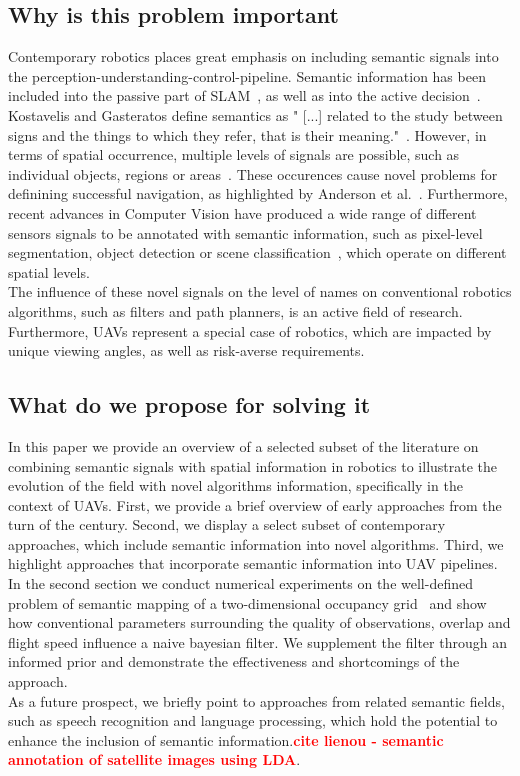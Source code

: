 \documentclass[twocolumn,letterpaper]{IEEEAerospaceCLS}  %
\newcommand\todo[1]{\textbf{\textcolor{red}{#1}}}
\begin{document}
\subsection{Why is this problem important}
Contemporary robotics places great emphasis on including semantic signals into the perception-understanding-control-pipeline. Semantic information has been included into the passive part of SLAM~\cite{cadena_past_2016,zhang_hierarchical_2019}, as well as into the active decision~\cite{koch_automatic_2019,alirezaie_exploiting_2017}. Kostavelis and Gasteratos define semantics as " [...] related to the study between signs and the things to which they refer, that is their meaning."~\cite{kostavelis_semantic_2015}. However, in terms of spatial occurrence, multiple levels of signals are possible, such as individual objects, regions or areas~\cite{kostavelis_semantic_2015}. These occurences cause novel problems for definining successful navigation, as highlighted by Anderson et al.~\cite{anderson_evaluation_2018}. Furthermore, recent advances in Computer Vision have produced a wide range of different sensors signals to be annotated with semantic information, such as pixel-level segmentation, object detection or scene classification~\cite{alom_history_2018}, which operate on different spatial levels.\\
The influence of these novel signals on the level of names on conventional robotics algorithms, such as filters and path planners, is an active field of research. Furthermore, UAVs represent a special case of robotics, which are impacted by unique viewing angles, as well as risk-averse requirements.
\subsection{What do we propose for solving it}
In this paper we provide an overview of a selected subset of the literature on combining semantic signals with spatial information in robotics to illustrate the evolution of the field with novel algorithms information, specifically in the context of UAVs. First, we provide a brief overview of early approaches from the turn of the century. Second, we display a select subset of contemporary approaches, which include semantic information into novel algorithms. Third, we highlight approaches that incorporate semantic information into UAV pipelines.\\
In the second section we conduct numerical experiments on the well-defined problem of semantic mapping of a two-dimensional occupancy grid~\cite{gonzalez_unmanned_2016} and show how conventional parameters surrounding the quality of observations, overlap and flight speed influence a naive bayesian filter. We supplement the filter through an informed prior and demonstrate the effectiveness and shortcomings of the approach.\\
As a future prospect, we briefly point to approaches from related semantic fields, such as speech recognition and language processing, which hold the potential to enhance the inclusion of semantic information.\todo{cite lienou - semantic annotation of satellite images using LDA}.
\end{document}
